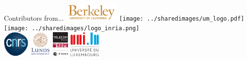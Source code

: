 \documentclass[unknownkeysallowed]{beamer}
\begin{document}
\begin{frame}{Contributors from...}
    \centering
    \includegraphics[height=35px]{../sharedimages/logo_berkeley.png} \hspace{1mm}
    \texttt{[image: ../sharedimages/um\_logo.pdf]} \hspace{1mm}
    \texttt{[image: ../sharedimages/logo\_inria.png]} \hspace{1mm} \\[7mm]
    \includegraphics[height=50px]{../sharedimages/logo_cnrs.pdf} \hspace{5mm}
    \includegraphics[height=50px]{../sharedimages/logo_lund} \hspace{5mm}
    \includegraphics[height=50px]{../sharedimages/logo_telecom.pdf} \hspace{5mm}
    \includegraphics[height=50px]{../sharedimages/logo_univ_luxembourg.pdf}
\end{frame}
\end{document}
